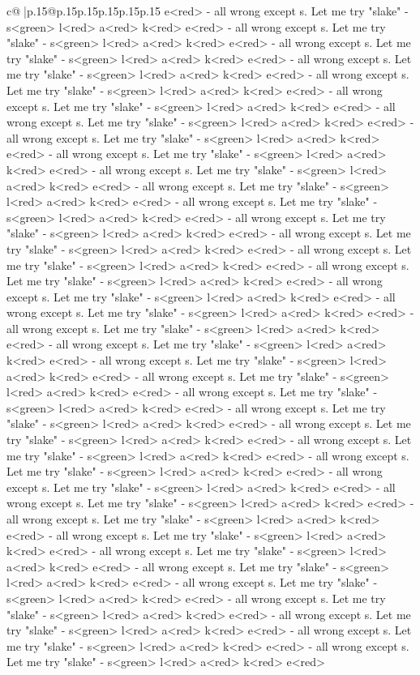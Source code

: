 \documentclass{article}
\begin{document}
{\begin{supertabular}{c@{$\;$}|p{.15\linewidth}@{}p{.15\linewidth}p{.15\linewidth}p{.15\linewidth}p{.15\linewidth}p{.15\linewidth}}
{{{e<red> {-} all wrong except s. Let me try "slake" {-} s<green> l<red> a<red> k<red> e<red> {-} all wrong except s. Let me try "slake" {-} s<green> l<red> a<red> k<red> e<red> {-} all wrong except s. Let me try "slake" {-} s<green> l<red> a<red> k<red> e<red> {-} all wrong except s. Let me try "slake" {-} s<green> l<red> a<red> k<red> e<red> {-} all wrong except s. Let me try "slake" {-} s<green> l<red> a<red> k<red> e<red> {-} all wrong except s. Let me try "slake" {-} s<green> l<red> a<red> k<red> e<red> {-} all wrong except s. Let me try "slake" {-} s<green> l<red> a<red> k<red> e<red> {-} all wrong except s. Let me try "slake" {-} s<green> l<red> a<red> k<red> e<red> {-} all wrong except s. Let me try "slake" {-} s<green> l<red> a<red> k<red> e<red> {-} all wrong except s. Let me try "slake" {-} s<green> l<red> a<red> k<red> e<red> {-} all wrong except s. Let me try "slake" {-} s<green> l<red> a<red> k<red> e<red> {-} all wrong except s. Let me try "slake" {-} s<green> l<red> a<red> k<red> e<red> {-} all wrong except s. Let me try "slake" {-} s<green> l<red> a<red> k<red> e<red> {-} all wrong except s. Let me try "slake" {-} s<green> l<red> a<red> k<red> e<red> {-} all wrong except s. Let me try "slake" {-} s<green> l<red> a<red> k<red> e<red> {-} all wrong except s. Let me try "slake" {-} s<green> l<red> a<red> k<red> e<red> {-} all wrong except s. Let me try "slake" {-} s<green> l<red> a<red> k<red> e<red> {-} all wrong except s. Let me try "slake" {-} s<green> l<red> a<red> k<red> e<red> {-} all wrong except s. Let me try "slake" {-} s<green> l<red> a<red> k<red> e<red> {-} all wrong except s. Let me try "slake" {-} s<green> l<red> a<red> k<red> e<red> {-} all wrong except s. Let me try "slake" {-} s<green> l<red> a<red> k<red> e<red> {-} all wrong except s. Let me try "slake" {-} s<green> l<red> a<red> k<red> e<red> {-} all wrong except s. Let me try "slake" {-} s<green> l<red> a<red> k<red> e<red> {-} all wrong except s. Let me try "slake" {-} s<green> l<red> a<red> k<red> e<red> {-} all wrong except s. Let me try "slake" {-} s<green> l<red> a<red> k<red> e<red> {-} all wrong except s. Let me try "slake" {-} s<green> l<red> a<red> k<red> e<red> {-} all wrong except s. Let me try "slake" {-} s<green> l<red> a<red> k<red> e<red> {-} all wrong except s. Let me try "slake" {-} s<green> l<red> a<red> k<red> e<red> {-} all wrong except s. Let me try "slake" {-} s<green> l<red> a<red> k<red> e<red> {-} all wrong except s. Let me try "slake" {-} s<green> l<red> a<red> k<red> e<red> {-} all wrong except s. Let me try "slake" {-} s<green> l<red> a<red> k<red> e<red> {-} all wrong except s. Let me try "slake" {-} s<green> l<red> a<red> k<red> e<red> {-} all wrong except s. Let me try "slake" {-} s<green> l<red> a<red> k<red> e<red> {-} all wrong except s. Let me try "slake" {-} s<green> l<red> a<red> k<red> e<red> {-} all wrong except s. Let me try "slake" {-} s<green> l<red> a<red> k<red> e<red> {-} all wrong except s. Let me try "slake" {-} s<green> l<red> a<red> k<red> e<red> {-} all wrong except s. Let me try "slake" {-} s<green> l<red> a<red> k<red> e<red> {-} all wrong except s. Let me try "slake" {-} s<green> l<red> a<red> k<red> e<red> }}}
\end{supertabular}}
\end{document}
